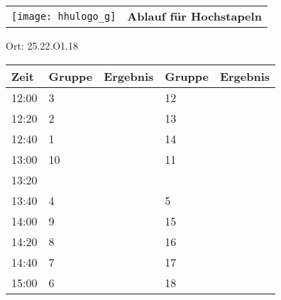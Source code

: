 \documentclass[a4paper,10pt]{article}
\def\spielc{Hochstapeln}
\def\raumc{25.22.O1.18}
\begin{document}
  \begin{tabularx}{\textwidth}{lc}
    \texttt{[image: hhulogo\_g]}
  & {\Huge \textbf{Ablauf für \spielc}}
  \end{tabularx}
  \LARGE
  \begin{center}
    \vspace{1cm} 
    Ort: \raumc
  \end{center}
    \vspace{2cm} 
    \begin{tabularx}{\textwidth}{X||X|X||X|X}
	\textbf{Zeit} &\textbf{Gruppe} & \textbf{Ergebnis} &\textbf{Gruppe} & \textbf{Ergebnis}  	\\ \hline \hline
	12:00 &	3	&	&12	&	\\ \hline
	12:20 &	2	&	&13	&	\\ \hline
	12:40 &1	&	&14	&	\\ \hline

	13:00 &	10	&	&11	&	\\ \hline
	13:20 &		&	&	&	\\ \hline
	13:40 &	4	&	&5	&	\\ \hline

	14:00 &	9	&	&15	&	\\ \hline
	14:20 &	8	&	&16	&	\\ \hline
	14:40 &	7	&	&17	&	\\ \hline

	15:00 &	6	&	&18	&	\\ \hline
      
    \end{tabularx}
   
   \newpage
\end{document}
